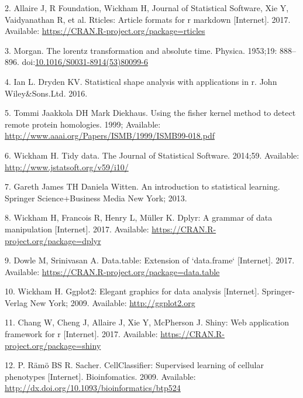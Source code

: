 \documentclass[10pt,letterpaper]{article}
\begin{document}
\hypertarget{ref-pkgrticles}{}
2. Allaire J, R Foundation, Wickham H, Journal of Statistical Software,
Xie Y, Vaidyanathan R, et al. Rticles: Article formats for r markdown
{[}Internet{]}. 2017. Available:
\url{https://CRAN.R-project.org/package=rticles}

\hypertarget{ref-Sch2017}{}
3. Morgan. The lorentz transformation and absolute time. Physica.
1953;19: 888--896.
doi:\href{https://doi.org/10.1016/S0031-8914(53)80099-6}{10.1016/S0031-8914(53)80099-6}

\hypertarget{ref-Dryden2016}{}
4. Ian L. Dryden KV. Statistical shape analysis with applications in r.
John Wiley\&Sons.Ltd. 2016.

\hypertarget{ref-Jaakkola1999}{}
5. Tommi Jaakkola DH Mark Diekhaus. Using the fisher kernel method to
detect remote protein homologies. 1999; Available:
\url{http://www.aaai.org/Papers/ISMB/1999/ISMB99-018.pdf}

\hypertarget{ref-pkgtidyr}{}
6. Wickham H. Tidy data. The Journal of Statistical Software. 2014;59.
Available: \url{http://www.jstatsoft.org/v59/i10/}

\hypertarget{ref-James2013}{}
7. Gareth James TH Daniela Witten. An introduction to statistical
learning. Springer Science+Business Media New York; 2013.

\hypertarget{ref-pkgdplyr}{}
8. Wickham H, Francois R, Henry L, Müller K. Dplyr: A grammar of data
manipulation {[}Internet{]}. 2017. Available:
\url{https://CRAN.R-project.org/package=dplyr}

\hypertarget{ref-pkgdatatable}{}
9. Dowle M, Srinivasan A. Data.table: Extension of `data.frame`
{[}Internet{]}. 2017. Available:
\url{https://CRAN.R-project.org/package=data.table}

\hypertarget{ref-pkgggplot2}{}
10. Wickham H. Ggplot2: Elegant graphics for data analysis
{[}Internet{]}. Springer-Verlag New York; 2009. Available:
\url{http://ggplot2.org}

\hypertarget{ref-pkgshiny}{}
11. Chang W, Cheng J, Allaire J, Xie Y, McPherson J. Shiny: Web
application framework for r {[}Internet{]}. 2017. Available:
\url{https://CRAN.R-project.org/package=shiny}

\hypertarget{ref-Pelkmanslab}{}
12. P. Rämö BS R. Sacher. CellClassifier: Supervised learning of
cellular phenotypes {[}Internet{]}. Bioinfomatics. 2009. Available:
\url{http://dx.doi.org/10.1093/bioinformatics/btp524}

\nolinenumbers
\end{document}
